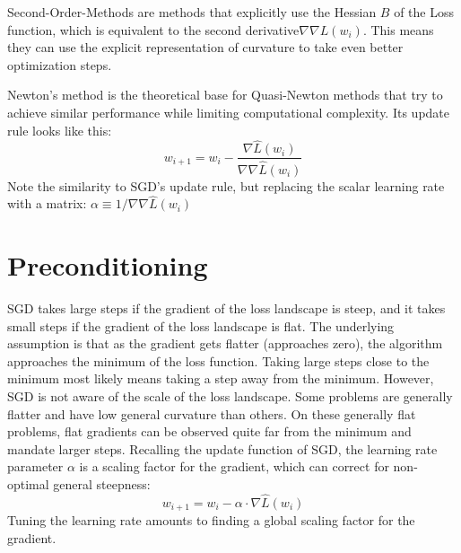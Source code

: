 \documentclass[twoside,12pt,a4paper]{report}
\begin{document}
Second-Order-Methods are methods that explicitly use the Hessian $B$ of the Loss function, which is equivalent to the second derivative$\nabla\nabla{L}(w_i)$. This means they can use the explicit representation of curvature to take even better optimization steps.

Newton's method is the theoretical base for Quasi-Newton methods that try to achieve similar performance while limiting computational complexity. Its update rule looks like this:
$$w_{i+1} = w_i - \frac{\nabla \hat{L}(w_i)}{\nabla\nabla\hat{L}(w_i)}$$
Note the similarity to SGD's update rule, but replacing the scalar learning rate with a matrix: $\alpha \equiv 1 / \nabla\nabla\hat{L}(w_i)$

\section{Preconditioning} \label{sec:preconditioning}
SGD takes large steps if the gradient of the loss landscape is steep, and it takes small steps if the gradient of the loss landscape is flat. The underlying assumption is that as the gradient gets flatter (approaches zero), the algorithm approaches the minimum of the loss function. Taking large steps close to the minimum most likely means taking a step away from the minimum.
However, SGD is not aware of the scale of the loss landscape. Some problems are generally flatter and have low general curvature than others. On these generally flat problems, flat gradients can be observed quite far from the minimum and mandate larger steps.
Recalling the update function of SGD, the learning rate parameter $\alpha$ is a scaling factor for the gradient, which can correct for non-optimal general steepness:
$$w_{i+1} = w_i - \alpha \cdot \nabla \hat{L}(w_i) $$
Tuning the learning rate amounts to finding a global scaling factor for the gradient.
\end{document}
